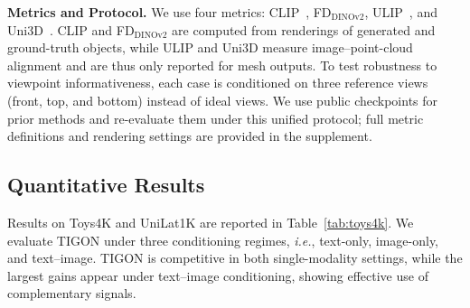 \noindent\textbf{Metrics and Protocol.}
We use four metrics: CLIP~\cite{clip}, FD$_{\text{DINOv2}}$, ULIP~\cite{ulip}, and Uni3D~\cite{uni3d}. CLIP and FD$_{\text{DINOv2}}$ are computed from renderings of generated and ground-truth objects, while ULIP and Uni3D measure image--point-cloud alignment and are thus only reported for mesh outputs. To test robustness to viewpoint informativeness, each case is conditioned on three reference views (front, top, and bottom) instead of ideal views. We use public checkpoints for prior methods and re-evaluate them under this unified protocol; full metric definitions and rendering settings are provided in the supplement.


\subsection{Quantitative Results}



Results on Toys4K and UniLat1K are reported in Table~\ref{tab:toys4k}. 
We evaluate TIGON under three conditioning regimes, \emph{i.e.}, text-only, image-only, and text–image. 
TIGON is competitive in both single-modality settings, while the largest gains appear under text–image conditioning, showing effective use of complementary signals.

